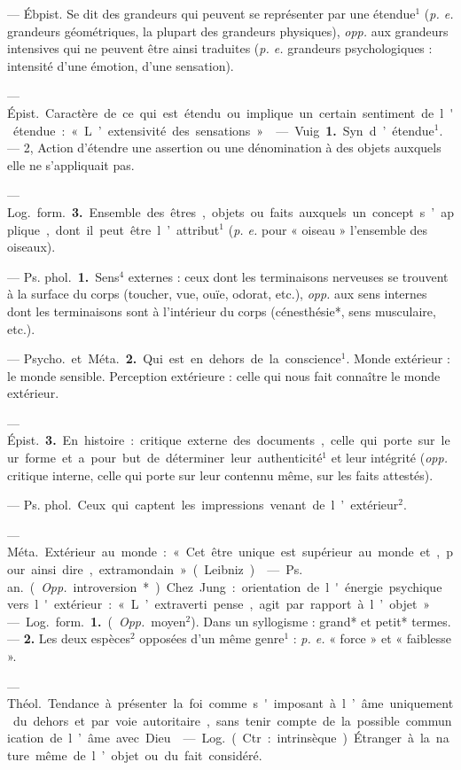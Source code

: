\begin{itemize}[leftmargin=1cm, label=, itemsep=1pt]
 — Ébpist. Se dit des grandeurs qui peuvent se représenter par
une étendue$^1$ ({\it p. e.} grandeurs géométriques, la plupart des grandeurs
physiques), {\it opp.} aux grandeurs
intensives qui ne peuvent être ainsi
traduites ({\it p. e.} grandeurs psychologiques : intensité d'une émotion,
d’une sensation).

 — \si{Épist.} Caractère de ce
qui est étendu ou implique un certain
sentiment de l'étendue : « L’extensivité des sensations ».

 — Vuig. {\bf 1.} Syn. d’étendue$^1$.
— 2, Action d'étendre une assertion ou une dénomination à des
objets auxquels elle ne s’appliquait
pas.

— \si{Log.} \si{form.} {\bf 3.} Ensemble des
êtres, objets ou faits auxquels un
concept s’applique, dont il peut être
l’attribut$^1$ ({\it p. e.} pour « oiseau »
l’ensemble des oiseaux).

 — \si{Ps. phol.} {\bf 1.}
Sens$^4$ externes : ceux dont les terminaisons nerveuses se trouvent à
la surface du corps (toucher, vue,
ouïe, odorat, etc.), {\it opp.} aux sens
internes dont les terminaisons sont
à l'intérieur du corps (cénesthésie*,
sens musculaire, etc.).

— \si{Psycho.} et \si{Méta.} {\bf 2.} Qui est en
dehors de la conscience$^1$. Monde
extérieur : le monde sensible. Perception extérieure : celle qui nous fait
connaître le monde extérieur.

— \si{Épist.} {\bf 3.} En histoire : critique
externe des documents, celle qui
porte sur leur forme et a pour but
de déterminer leur authenticité$^1$ et
leur intégrité ({\it opp.} critique interne,
celle qui porte sur leur contennu
même, sur les faits attestés).

 — \si{Ps. phol.}
Ceux qui captent les impressions
venant de l’extérieur$^2$.

 — \si{Méta.} Extérieur au
monde : « Cet être unique est supérieur au monde et, pour ainsi dire,
extramondain » (Leibniz).

 — \si{Ps. an.} ({\it Opp.}
introversion*) Chez Jung : orientation de l'énergie psychique vers
l'extérieur : « L’extraverti pense,
agit par rapport à l’objet. »

 — \si{Log.} \si{form.} {\bf 1.} ({\it Opp.}
moyen$^2$). Dans un syllogisme : grand*
et petit* termes. — {\bf 2.} Les deux
espèces$^2$ opposées d’un même genre$^1$ :
{\it p. e.} « force » et « faiblesse ».

 — \si{Théol.} Tendance à
présenter la foi comme s'imposant à
l’âme uniquement du dehors et par
voie autoritaire, sans tenir compte de
la possible communication de l’âme
avec Dieu.

 — \si{Log.} (Ctr. :
intrinsèque) Étranger à la nature même
de l’objet ou du fait considéré.

	\end{itemize}
